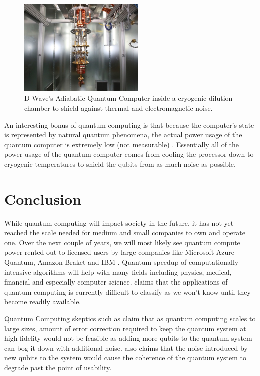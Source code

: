 \documentclass[conference]{IEEEtran}
\begin{document}
\begin{figure}[htbp]
\centerline{\includegraphics[width=6cm]{dwave}}
\caption{D-Wave's Adiabatic Quantum Computer inside a cryogenic dilution chamber to shield against thermal and electromagnetic noise.}
\label{dwave}
\end{figure}

An interesting bonus of quantum computing is that because the computer's state is represented by natural quantum phenomena, the actual power usage of the quantum computer is extremely low (not measurable) \cite{b13}. Essentially all of the power usage of the quantum computer comes from cooling the processor down to cryogenic temperatures to shield the qubits from as much noise as possible.

\section{Conclusion}

While quantum computing will impact society in the future, it has not yet reached the scale needed for medium and small companies to own and operate one. Over the next couple of years, we will most likely see quantum compute power rented out to licensed users by large companies like Microsoft Azure Quantum, Amazon Braket and IBM  \cite{b1}. Quantum speedup of computationally intensive algorithms will help with many fields including physics, medical, financial and especially computer science. \cite{b2} claims that the applications of quantum computing is currently difficult to classify as we won't know until they become readily available.

Quantum Computing skeptics such as \cite{b16} claim that as quantum computing scales to large sizes, amount of error correction required to keep the quantum system at high fidelity would not be feasible as adding more qubits to the quantum system can bog it down with additional noise. \cite{b16} also claims that the noise introduced by new qubits to the system would cause the coherence of the quantum system to degrade past the point of usability.
\end{document}
